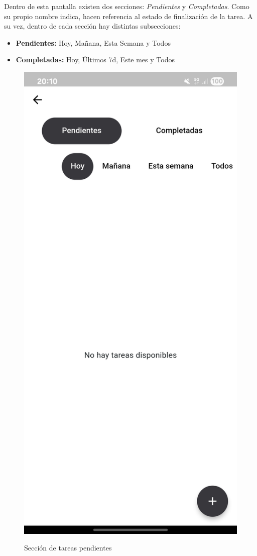 Dentro de esta pantalla existen dos secciones: \textit{Pendientes} y \textit{Completadas}. Como su propio nombre indica, hacen referencia al estado de finalización de la tarea. A su vez, dentro de cada sección hay distintas subsecciones:
\begin{itemize}
    \item \textbf{Pendientes:} Hoy, Mañana, Esta Semana y Todos
    \item \textbf{Completadas:} Hoy, Últimos 7d, Este mes y Todos
\end{itemize}
\begin{figure}[H]
  \centering
  \begin{floatrow}
    \ffigbox
      {\includegraphics[width=0.5\linewidth]{img/tareas_personales_pendientes.jpg}}
      {\caption{Sección de tareas pendientes}
      \label{fig:tareas_personales_pendientes}}
    \hfill
    \ffigbox

\end{floatrow}
\end{figure}
